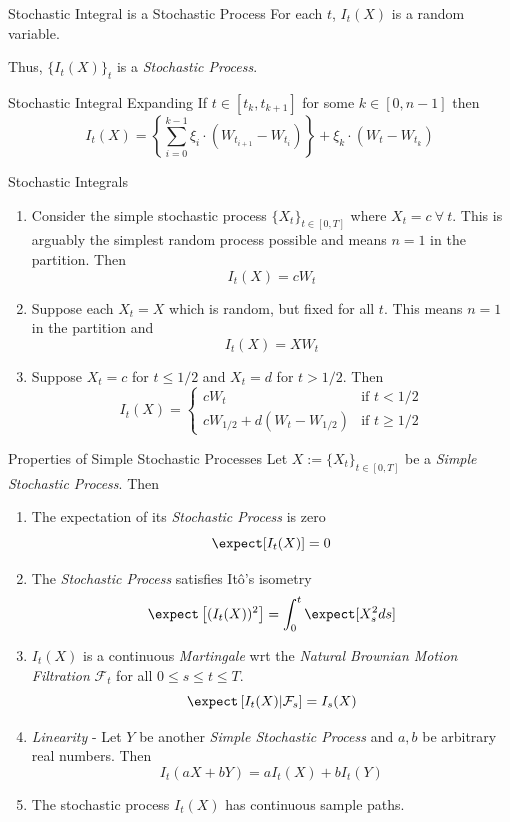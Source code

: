 \documentclass[11pt,a4paper]{article}
\begin{document}
  \begin{remark}{Stochastic Integral is a Stochastic Process}
    For each $t$, $I_t(X)$ is a random variable.
    \par Thus, $\{I_t(X)\}_t$ is a \textit{Stochastic Process}.
  \end{remark}

  \begin{remark}{Stochastic Integral Expanding}
    If $t\in[t_k,t_{k+1}]$ for some $k\in[0,n-1]$ then
    \[ I_t(X)=\left\{\sum_{i=0}^{k-1}\xi_i\cdot(W_{t_{i+1}}-W_{t_i})\right\}+\xi_k\cdot(W_t-W_{t_k}) \]
  \end{remark}

  \begin{example}{Stochastic Integrals}
    \begin{enumerate}
      \item Consider the simple stochastic process $\{X_t\}_{t\in[0,T]}$ where $X_t=c\ \forall\ t$. This is arguably the simplest random process possible and means $n=1$ in the partition. Then
      \[ I_t(X)=cW_t \]
      \item Suppose each $X_t=X$ which is random, but fixed for all $t$. This means $n=1$ in the partition and
      \[ I_t(X)=XW_t \]
      \item Suppose $X_t=c$ for $t\leq1/2$ and $X_t=d$ for $t>1/2$. Then
      \[ I_t(X)=\begin{cases}cW_t&\text{if }t<1/2\\cW_{1/2}+d(W_t-W_{1/2})&\text{if }t\geq1/2\end{cases} \]
    \end{enumerate}
  \end{example}

  \begin{theorem}{Properties of Simple Stochastic Processes}\label{the_properties_of_simple_stochastic_processes}
    Let $X:=\{X_t\}_{t\in[0,T]}$ be a \textit{Simple Stochastic Process}. Then
    \begin{enumerate}
      \item The expectation of its \textit{Stochastic Process} is zero
      \[ \expect[I_t(X)]=0 \]
      \item The \textit{Stochastic Process} satisfies It\^o's isometry
      \[ \expect\left[(I_t(X))^2\right]=\int_0^t\expect[X_s^2ds] \]
      \item $I_t(X)$ is a continuous \textit{Martingale} wrt the \textit{Natural Brownian Motion Filtration} $\mathcal{F}_t$ for all $0\leq s\leq t\leq T$.
      \[ \expect\left[I_t(X)|\mathcal{F}_s\right]=I_s(X) \]
      \item \textit{Linearity} - Let $Y$ be another \textit{Simple Stochastic Process} and $a,b$ be arbitrary real numbers. Then
      \[ I_t(aX+bY)=aI_t(X)+bI_t(Y) \]
      \item The stochastic process $I_t(X)$ has continuous sample paths.
    \end{enumerate}
  \end{theorem}
\end{document}
